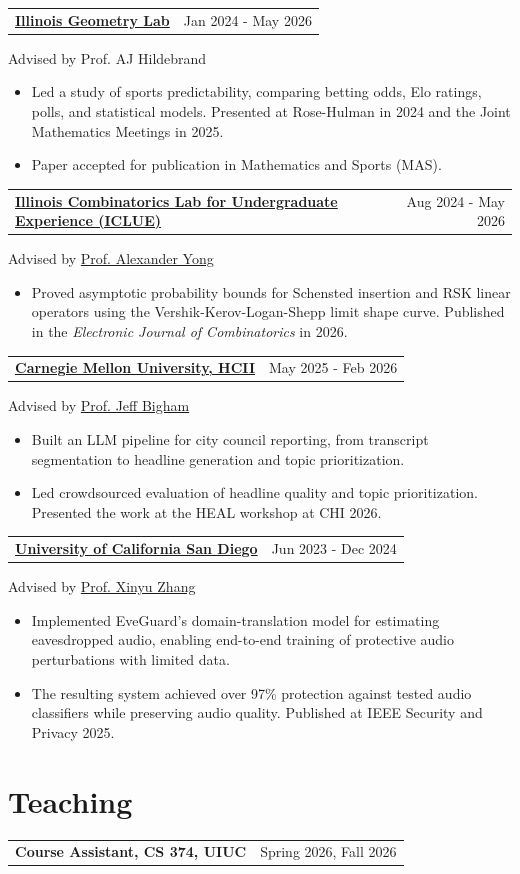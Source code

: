 \documentclass[letterpaper,11pt]{article}
\makeatletter
\newcommand{\role}[3]{\par\addvspace{3pt}\begin{tabularx}{\textwidth}{@{}Xr@{}}\textbf{#1}&\small #2\end{tabularx}\par{\small #3}\par}
\makeatother
\begin{document}
\role{\href{https://iml.math.illinois.edu/}{Illinois Geometry Lab}}{Jan 2024 - May 2026}{Advised by Prof. AJ Hildebrand}
\begin{itemize}
\item Led a study of sports predictability, comparing betting odds, Elo ratings, polls, and statistical models. Presented at Rose-Hulman in 2024 and the Joint Mathematics Meetings in 2025.
\item Paper accepted for publication in Mathematics and Sports (MAS).
\end{itemize}
\role{\href{https://ayong.web.illinois.edu/ICLUE.html}{Illinois Combinatorics Lab for Undergraduate Experience (ICLUE)}}{Aug 2024 - May 2026}{Advised by \href{https://ayong.web.illinois.edu/}{Prof. Alexander Yong}}
\begin{itemize}
\item Proved asymptotic probability bounds for Schensted insertion and RSK linear operators using the Vershik-Kerov-Logan-Shepp limit shape curve. Published in the \emph{Electronic Journal of Combinatorics} in 2026.
\end{itemize}
\role{\href{https://www.cs.cmu.edu/~jbigham/}{Carnegie Mellon University, HCII}}{May 2025 - Feb 2026}{Advised by \href{https://www.cs.cmu.edu/~jbigham/}{Prof. Jeff Bigham}}
\begin{itemize}
\item Built an LLM pipeline for city council reporting, from transcript segmentation to headline generation and topic prioritization.
\item Led crowdsourced evaluation of headline quality and topic prioritization. Presented the work at the HEAL workshop at CHI 2026.
\end{itemize}
\role{\href{https://xyzhang.ucsd.edu/index.html}{University of California San Diego}}{Jun 2023 - Dec 2024}{Advised by \href{https://xyzhang.ucsd.edu/index.html}{Prof. Xinyu Zhang}}
\begin{itemize}
\item Implemented EveGuard's domain-translation model for estimating eavesdropped audio, enabling end-to-end training of protective audio perturbations with limited data.
\item The resulting system achieved over 97\% protection against tested audio classifiers while preserving audio quality. Published at IEEE Security and Privacy 2025.
\end{itemize}
\section{Teaching}
\role{Course Assistant, CS 374, UIUC}{Spring 2026, Fall 2026}{}
\end{document}
